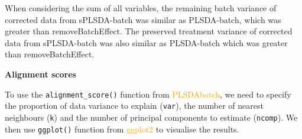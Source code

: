 \documentclass[
]{book}
\newenvironment{Shaded}{\begin{snugshade}}{\end{snugshade}}
\newcommand{\AttributeTok}[1]{\textcolor[rgb]{0.77,0.63,0.00}{#1}}
\newcommand{\ControlFlowTok}[1]{\textcolor[rgb]{0.13,0.29,0.53}{\textbf{#1}}}
\newcommand{\DecValTok}[1]{\textcolor[rgb]{0.00,0.00,0.81}{#1}}
\newcommand{\FloatTok}[1]{\textcolor[rgb]{0.00,0.00,0.81}{#1}}
\newcommand{\FunctionTok}[1]{\textcolor[rgb]{0.00,0.00,0.00}{#1}}
\newcommand{\NormalTok}[1]{#1}
\newcommand{\OtherTok}[1]{\textcolor[rgb]{0.56,0.35,0.01}{#1}}
\newcommand{\SpecialCharTok}[1]{\textcolor[rgb]{0.00,0.00,0.00}{#1}}
\begin{document}
When considering the sum of all variables, the remaining batch variance of corrected data from sPLSDA-batch was similar as PLSDA-batch, which was greater than removeBatchEffect. The preserved treatment variance of corrected data from sPLSDA-batch was also similar as PLSDA-batch which was greater than removeBatchEffect.

\textbf{Alignment scores}

To use the \texttt{alignment\_score()} function from \textcolor{orange}{PLSDAbatch}, we need to specify the proportion of data variance to explain (\texttt{var}), the number of nearest neighbours (\texttt{k}) and the number of principal components to estimate (\texttt{ncomp}). We then use \texttt{ggplot()} function from \textcolor{orange}{ggplot2} to visualise the results.

\begin{Shaded}
\end{Shaded}
\end{document}
